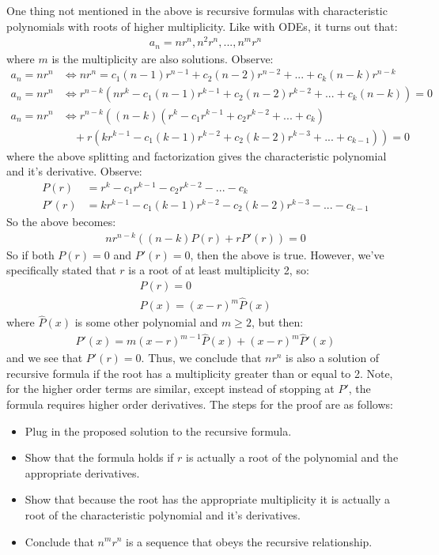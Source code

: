 \documentclass{article}
\begin{document}
One thing not mentioned in the above is recursive formulas with characteristic polynomials with roots of higher multiplicity. Like with ODEs, it turns out that:
\begin{gather*}
	a_{n} = nr^{n}, n^{2}r^{n}, ..., n^{m}r^{n}
\end{gather*}
where $m$ is the multiplicity are also solutions. Observe:
\begin{align*}
	a_{n} = nr^{n} &\iff nr^{n} = c_{1}(n - 1)r^{n - 1} + c_{2}(n - 2)r^{n - 2} + ... + c_{k}(n - k)r^{n - k}\\
	a_{n} = nr^{n} &\iff r^{n - k}\left(nr^{k} - c_{1}(n - 1)r^{k - 1} + c_{2}(n - 2)r^{k - 2} + ... + c_{k}(n - k)\right) = 0\\
	a_{n} = nr^{n} &\iff r^{n - k}\left((n - k)\left(r^{k} - c_{1}r^{k - 1} + c_{2}r^{k - 2} + ... + c_{k}\right)\right.\\
	&\quad+ r\left.\left(kr^{k - 1} - c_{1}(k - 1)r^{k - 2} + c_{2}(k - 2)r^{k - 3} + ... + c_{k - 1}\right)\right) = 0
\end{align*}
where the above splitting and factorization gives the characteristic polynomial and it's derivative. Observe:
\begin{align*}
	P(r) &= r^{k} - c_{1}r^{k - 1} - c_{2}r^{k - 2} - ... - c_{k}\\
	P'(r) &= kr^{k - 1} - c_{1}(k - 1)r^{k - 2} - c_{2}(k - 2)r^{k - 3} - ... - c_{k - 1}
\end{align*}
So the above becomes:
\begin{gather*}
	nr^{n - k}((n - k)P(r) + rP'(r)) = 0
\end{gather*}
So if both $P(r) = 0$ and $P'(r) = 0$, then the above is true. However, we've specifically stated that $r$ is a root of at least multiplicity 2, so:
\begin{gather*}
	P(r) = 0\\
	P(x) = (x - r)^{m}\hat{P}(x)
\end{gather*}
where $\hat{P}(x)$ is some other polynomial and $m \ge 2$, but then:
\begin{gather*}
	P'(x) = m(x - r)^{m - 1}\hat{P}(x) + (x - r)^{m}\hat{P}'(x)
\end{gather*}
and we see that $P'(r) = 0$. Thus, we conclude that $nr^{n}$ is also a solution of recursive formula if the root has a multiplicity greater than or equal to 2. Note, for the higher order terms are similar, except instead of stopping at $P'$, the formula requires higher order derivatives. The steps for the proof are as follows:
\begin{itemize}
 	\item Plug in the proposed solution to the recursive formula.
 	\item Show that the formula holds if $r$ is actually a root of the polynomial and the appropriate derivatives.
 	\item Show that because the root has the appropriate multiplicity it is actually a root of the characteristic polynomial and it's derivatives.
 	\item Conclude that $n^{m}r^{n}$ is a sequence that obeys the recursive relationship.
\end{itemize}
\end{document}
